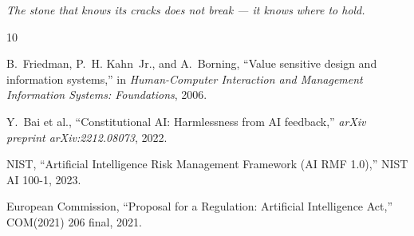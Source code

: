 \documentclass[12pt,a4paper]{article}
\theoremstyle{definition}
\begin{document}
\bigskip
\noindent\textit{The stone that knows its cracks does not break — it knows
where to hold.}


\begin{thebibliography}{10}

B.~Friedman, P.~H. Kahn~Jr., and A.~Borning,
``Value sensitive design and information systems,''
in \emph{Human-Computer Interaction and Management Information Systems:
Foundations}, 2006.

Y.~Bai et al.,
``Constitutional AI: Harmlessness from AI feedback,''
\emph{arXiv preprint arXiv:2212.08073}, 2022.

NIST,
``Artificial Intelligence Risk Management Framework (AI RMF 1.0),''
NIST AI 100-1, 2023.

European Commission,
``Proposal for a Regulation: Artificial Intelligence Act,''
COM(2021) 206 final, 2021.

\end{thebibliography}
\end{document}
